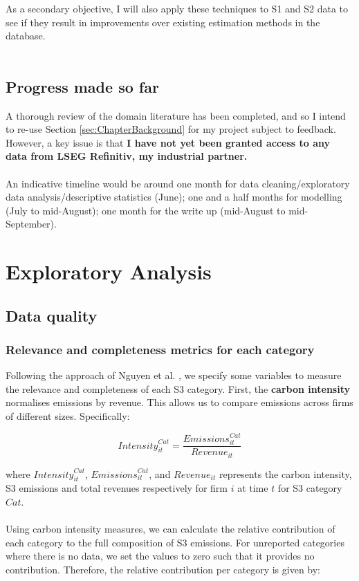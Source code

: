 \documentclass[12pt,twoside]{report}
\begin{document}
As a secondary objective, I will also apply these techniques to S1 and S2 data to see if they result in improvements over existing estimation methods in the database.  
\\\\
\section{Progress made so far}
A thorough review of the domain literature has been completed, and so I intend to re-use Section \ref{sec:ChapterBackground} for my project subject to feedback. However, a key issue is that \textbf{I have not yet been granted access to any data from LSEG Refinitiv, my industrial partner.} 
\\\\
An indicative timeline would be around one month for data cleaning/exploratory data analysis/descriptive statistics (June); one and a half months for modelling (July to mid-August); one month for the write up (mid-August to mid-September). 

\chapter{Exploratory Analysis}
\section{Data quality}
\subsection{Relevance and completeness metrics for each category}

Following the approach of Nguyen et al. \cite{Nguyenetal2023}, we specify some variables to measure the relevance and completeness of each S3 category. First, the \textbf{carbon intensity} normalises emissions by revenue. This allows us to compare emissions across firms of different sizes. Specifically:

\begin{equation}
    \mathit{Intensity}_{it}^{Cat} = \frac{\mathit{Emissions}_{it}^{Cat}}{\mathit{Revenue}_{it}}
\end{equation}

where $\mathit{Intensity}_{it}^{Cat}$, $\mathit{Emissions}_{it}^{Cat}$, and $\mathit{Revenue}_{it}$ represents the carbon intensity, S3 emissions and total revenues respectively for firm $i$ at time $t$ for S3 category $\mathit{Cat}$.
\\\\
Using carbon intensity measures, we can calculate the relative contribution of each category to the full composition of S3 emissions. For unreported categories where there is no data, we set the values to zero such that it provides no contribution. Therefore, the relative contribution per category is given by:
\end{document}
